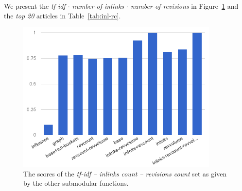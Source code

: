 We present the \emph{tf-idf \(\cdot\) number-of-inlinks \(\cdot\)
number-of-revisions} in Figure~\ref{img:inl-rc} and the \emph{top 20} articles
in Table~\ref{tab:inl-rc}.
\begin{figure}
  \centering
  \includegraphics[width=0.9\textwidth,natwidth=555,natheight=419]{images/inl-rc.png}
  \caption{The scores of the \emph{tf-idf -- inlinks count -- revisions count}
  set as given by the other submodular functions.}
  \label{img:inl-rc}
\end{figure}

